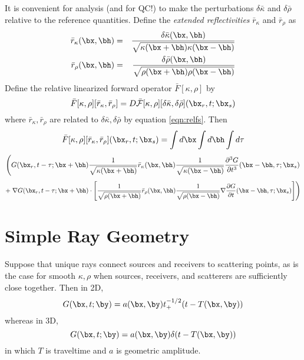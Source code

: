 It is convenient for analysis (and for QC!) to make the perturbations
$\delta \bar{\kappa}$ and $\delta \bar{\rho}$ relative to the
reference quantities. Define the {\em extended reflectivities} $\bar{r}_{\kappa}$
and $\bar{r}_{\rho}$ as 
\begin{eqnarray}
\label{eqn:relfs}
\bar{r}_{\kappa}(\bx,\bh)& = & \frac{\delta
                               \bar{\kappa}(\bx,\bh)}{\sqrt{\kappa(\bx+\bh)\kappa(\bx-\bh)}}
                               \nonumber \\
\bar{r}_{\rho}(\bx,\bh)& = & \frac{\delta \bar{\rho}(\bx,\bh)}{\sqrt{\rho(\bx+\bh)\rho(\bx-\bh)}}
\end{eqnarray}
Define the relative linearized forward operator $\bar{F}[\kappa,\rho]$ by
\begin{equation}
\label{eqn:nondim}
\bar{F}[\kappa,\rho][\bar{r}_{\kappa},\bar{r}_{\rho}] =
D\bar{{\cal F}}[\kappa,\rho][\delta 
\bar{\kappa},\delta\bar{\rho}](\bx_r,t;\bx_s) 
\end{equation}
where $\bar{r}_{\kappa},\bar{r}_{\rho}$ are related to $\delta 
\bar{\kappa},\delta\bar{\rho}$ by equation \ref{eqn:relfs}. Then
\[
\bar{F}[\kappa,\rho][\bar{r}_{\kappa},\bar{r}_{\rho}](\bx_r,t;\bx_s) 
=\int d\bx\int d\bh \int d\tau 
\]
\[
\left(G(\bx_r,t-\tau;\bx+\bh) 
\frac{1}{\sqrt{\kappa(\bx+\bh)}}  \bar{r}_{\kappa}(\bx,\bh) \frac{1}{\sqrt{\kappa(\bx-\bh)}}
 \frac{\partial^3 G}{\partial t^3}(\bx-\bh,\tau;\bx_s) 
\right.
\]
\begin{equation}
\label{eqn:intrep3nd}
+\left. \nabla G(\bx_r,t-\tau;\bx+\bh) \cdot \left[
\frac{1}{\sqrt{\rho(\bx+\bh)}} \bar{r}_{\rho}(\bx,\bh) \frac{1}{\sqrt{\rho(\bx-\bh)}}\nabla 
 \frac{\partial G}{\partial t}(\bx-\bh,\tau;\bx_s)\right]\right)
\end{equation}


\section{Simple Ray Geometry}

Suppose that unique rays connect sources and receivers to scattering
points, as is the case for smooth $\kappa, \rho$ when sources,
receivers, and scatterers are sufficiently close together. Then in 2D,
\begin{equation}
\label{eqn:simp2d}
G(\bx,t;\by) = a(\bx,\by)t_+^{-1/2}(t-T(\bx,\by)) 
\end{equation}
whereas in 3D,
\begin{equation}
\label{eqn:simp3d}
G(\bx,t;\by) = a(\bx,\by)\delta(t-T(\bx,\by)) 
\end{equation}
in which $T$ is traveltime and $a$ is geometric amplitude. 

